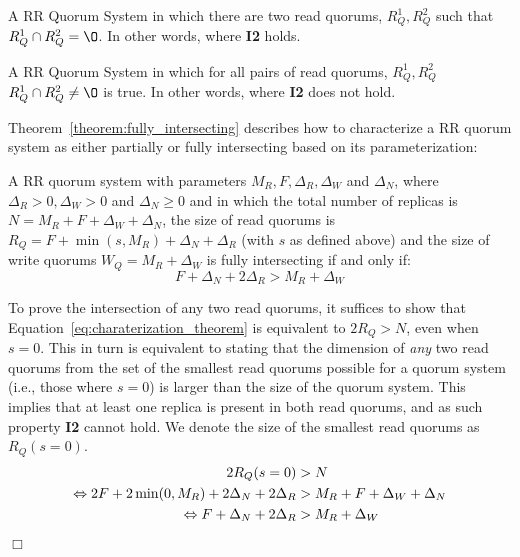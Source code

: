 \begin{defin} 
    A \ac{RR} Quorum System in which there are two read
    quorums, $R_Q^1, R_Q^2$ such that $R_Q^1 \cap R_Q^2 =
    \O$. In other words, where \textbf{I2} holds.
\end{defin}

\begin{defin} 
    A \ac{RR} Quorum System in which for all pairs of read
    quorums, $R_Q^1, R_Q^2$ $R_Q^1 \cap R_Q^2 \neq
    \O$ is true. In other words, where \textbf{I2} does not
    hold.
\end{defin}

Theorem~\ref{theorem:fully_intersecting} describes how to
characterize a \ac{RR} quorum system as either partially or
fully intersecting based on its parameterization:

\begin{theorem} \label{theorem:fully_intersecting}
    A \ac{RR} quorum system with parameters $M_R, F,
    \Delta_R, \Delta_W$ and $\Delta_N$, where $\Delta_R > 0,
    \Delta_W > 0$ and $\Delta_N \geq 0$ and in which the
    total number of replicas is $N = M_R + F + \Delta_W +
    \Delta_N$, the size of read quorums is $R_Q = F + \min(s,
    M_R) + \Delta_N + \Delta_R$ (with $s$ as defined above)
    and the size of write quorums $W_Q = M_R + \Delta_W$ is
    fully intersecting if and only if:
    \begin{equation}\label{eq:charaterization_theorem}
        F + \Delta_N + 2 \Delta_R > M_R + \Delta_W
    \end{equation}
\end{theorem}
\begin{dem}
    To prove the intersection of any two read quorums, it
    suffices to show that
    Equation~\ref{eq:charaterization_theorem} is equivalent to $2
    R_Q > N$, even when $s = 0$. This in turn is equivalent to
    stating that the dimension of \emph{any} two read quorums
    from the set of the smallest read quorums possible for a
    quorum system (i.e., those where $s = 0$) is larger than the
    size of the quorum system. This implies that at least one
    replica is present in both read quorums, and as such property
    \textbf{I2} cannot hold. We denote the size of the smallest
    read quorums as $R_Q(s = 0)$.
    \begin{align*}
        2 R_Q (s = 0) &> N  \\
        \Leftrightarrow 2F + 2\min(0, M_R) + 2\Delta_N + 2\Delta_R &> M_R + F + \Delta_W + \Delta_N  \\
        \Leftrightarrow F + \Delta_N + 2\Delta_R &> M_R + \Delta_W \\
    \end{align*}
    \hfill\ensuremath{\Box}\vspace{2em}
\end{dem}

